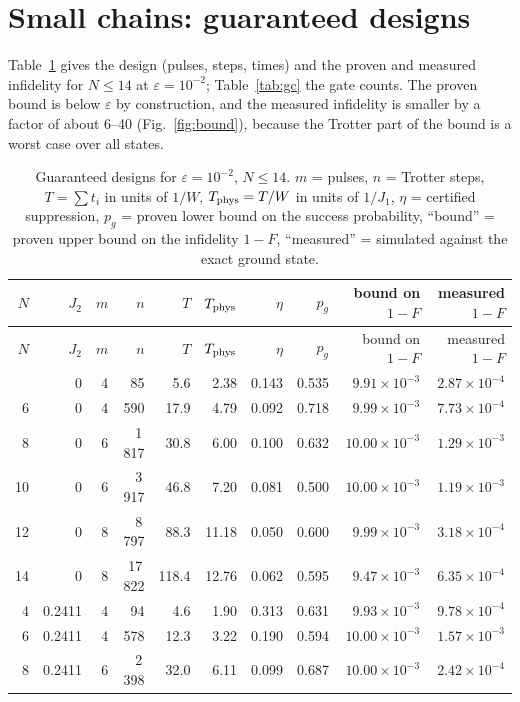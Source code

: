 \documentclass[11pt]{article}
\begin{document}
\section{Small chains: guaranteed designs}\label{sec:small}
Table~\ref{tab:gd} gives the design (pulses, steps, times) and the proven and measured infidelity for $N\leq14$ at $\varepsilon=10^{-2}$; Table~\ref{tab:gc} the gate counts. The proven bound is below $\varepsilon$ by construction, and the measured infidelity is smaller by a factor of about 6--40 (Fig.~\ref{fig:bound}), because the Trotter part of the bound is a worst case over all states.
{\small
\begin{longtable}{rrrrrrrrrr}
\caption{Guaranteed designs for $\varepsilon=10^{-2}$, $N\leq14$. $m$ = pulses, $n$ = Trotter steps, $T=\sum t_i$ in units of $1/W$, $T_{\rm phys}=T/W$ in units of $1/J_1$, $\eta$ = certified suppression, $p_g$ = proven lower bound on the success probability, ``bound'' = proven upper bound on the infidelity $1-F$, ``measured'' = simulated against the exact ground state.}\label{tab:gd}\\
\toprule
$N$ & $J_2$ & $m$ & $n$ & $T$ & $T_{\rm phys}$ & $\eta$ & $p_g$ & bound on $1-F$ & measured $1-F$ \\
\midrule
\endfirsthead
\toprule
$N$ & $J_2$ & $m$ & $n$ & $T$ & $T_{\rm phys}$ & $\eta$ & $p_g$ & bound on $1-F$ & measured $1-F$ \\
\midrule
\endhead
\bottomrule
\endfoot
4 & 0 & 4 & 85 & 5.6 & 2.38 & 0.143 & 0.535 & $9.91\times10^{-3}$ & $2.87\times10^{-4}$ \\
6 & 0 & 4 & 590 & 17.9 & 4.79 & 0.092 & 0.718 & $9.99\times10^{-3}$ & $7.73\times10^{-4}$ \\
8 & 0 & 6 & 1\,817 & 30.8 & 6.00 & 0.100 & 0.632 & $10.00\times10^{-3}$ & $1.29\times10^{-3}$ \\
10 & 0 & 6 & 3\,917 & 46.8 & 7.20 & 0.081 & 0.500 & $10.00\times10^{-3}$ & $1.19\times10^{-3}$ \\
12 & 0 & 8 & 8\,797 & 88.3 & 11.18 & 0.050 & 0.600 & $9.99\times10^{-3}$ & $3.18\times10^{-4}$ \\
14 & 0 & 8 & 17\,822 & 118.4 & 12.76 & 0.062 & 0.595 & $9.47\times10^{-3}$ & $6.35\times10^{-4}$ \\
4 & 0.2411 & 4 & 94 & 4.6 & 1.90 & 0.313 & 0.631 & $9.93\times10^{-3}$ & $9.78\times10^{-4}$ \\
6 & 0.2411 & 4 & 578 & 12.3 & 3.22 & 0.190 & 0.594 & $10.00\times10^{-3}$ & $1.57\times10^{-3}$ \\
8 & 0.2411 & 6 & 2\,398 & 32.0 & 6.11 & 0.099 & 0.687 & $10.00\times10^{-3}$ & $2.42\times10^{-4}$ \\

\end{longtable}}
\end{document}
